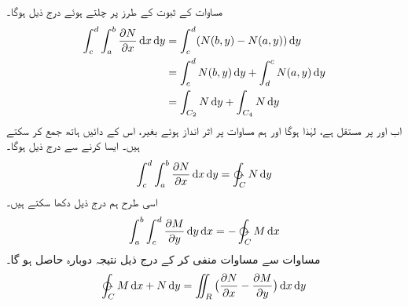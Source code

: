 مساوات     کے ثبوت کے طرز پر چلتے ہوئے  درج ذیل ہوگا۔ 
 \begin{gather}
\begin{aligned}\label{مساوات_سمتی_تکمل_درمیان_ثبوت}
     \int_{c}^{d} \int_{a}^{b} \frac{\partial N}{\partial x} \dif x \dif y &= \int_{c}^{d} (N(b,y)-N(a,y)) \dif y\\  
        &= \int_{c}^{d} N(b,y) \dif y + \int_{d}^{c} N(a,y) \dif y\\   
          &= \int_{C_2} N \dif y + \int_{C_4} N \dif y 
\end{aligned}
\end{gather}
 اب  اور   پر   مستقل ہے،  لہٰذا  ہوگا اور ہم مساوات        پر اثر انداز ہوئے بغیر، اس  کے دائیں ہاتھ  جمع کر سکتے ہیں۔ ایسا کرنے سے درج ذیل ہوگا۔  
\begin{align}\label{مساوات_سمتی_تکمل_نتیجہ_الف}
     \int_c^d \int_{a}^{b} \frac{\partial N}{\partial x} \dif x \dif y = \ointctrclockwise_C N \dif y 
\end{align}
 اسی طرح ہم  درج ذیل  دکھا سکتے ہیں۔ 
\begin{align}\label{مساوات_سمتی_تکمل_نتیجہ_ب}
     \int_{a}^{b} \int_c^d  \frac{\partial M}{\partial y} \dif y \dif x  = -\ointctrclockwise_C M \dif x 
\end{align}
 مساوات     سے مساوات     منفی کر کے  درج ذیل نتیجہ   دوبارہ حاصل ہو گا۔ 
\begin{align*}
\ointctrclockwise_C M \dif x + N \dif y = \iint_R \big(\frac{\partial N}{\partial x} - \frac{\partial M}{\partial y}\big) \dif x \dif y 
\end{align*}

